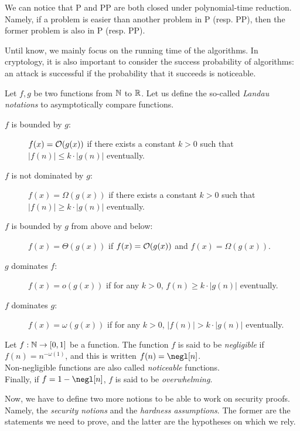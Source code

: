 We can notice that \textsf{P} and \textsf{PP} are both closed under polynomial-time reduction.
Namely, if a problem is easier than another problem in \textsf{P} (resp. \textsf{PP}), then the former problem is also in \textsf{P} (resp. \textsf{PP}).

Until know, we mainly focus on the running time of the algorithms.
In cryptology, it is also important to consider the success probability of algorithms:
an attack is successful if the probability that it succeeds is noticeable.

\begin{definition}
  Let $f,g$ be two functions from $\mathbb{N}$ to $\mathbb{R}$. Let us define the so-called \textit{Landau notations} to asymptotically compare functions.
  \begin{description}
    \item[$f$ is bounded by $g$:] $f(x) = \mathcal{O}(g(x))$ if there exists a constant $k>0$ such that $|f(n)| \leq k \cdot |g(n)|$ eventually.
    \item[$f$ is not dominated by $g$:] $f(x) = \Omega(g(x))$ if there exists a constant $k>0$ such that $|f(n)| \geq k \cdot |g(n)|$ eventually.
    \item[$f$ is bounded by $g$ from above and below:] $f(x) = \Theta(g(x))$ if $f(x) = \mathcal{O}(g(x))$ and $f(x) = \Omega(g(x))$.
    \item[$g$ dominates $f$:] $f(x) = o(g(x))$ if for any $k > 0$, $f(n) \geq k \cdot |g(n)|$ eventually.
    \item[$f$ dominates $g$:] $f(x) = \omega(g(x))$ if for any $k > 0$, $|f(n)| > k \cdot |g(n)|$ eventually.
  \end{description}
\end{definition}

\begin{definition} \label{de:negligible}
    
  Let $f : \mathbb{N} \to [0,1]$ be a function. The function $f$ is said to be \emph{negligible} if $f(n) = n^{-\omega(1)}_{}$, and this is written $f(n) = \negl[n]$.\\
  Non-negligible functions are also called \emph{noticeable} functions.\\
  Finally, if $f = 1 - \negl[n]$, $f$ is said to be \emph{overwhelming}.
\end{definition}

Now, we have to define two more notions to be able to work on security proofs.
Namely, the \textit{security notions} and the \textit{hardness assumptions}.
The former are the statements we need to prove, and the latter are the hypotheses on which we rely.
 

